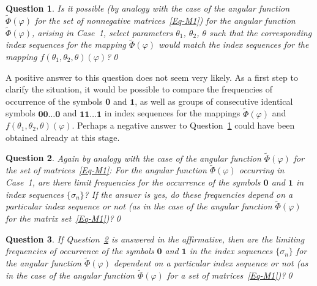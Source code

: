 \documentclass[a4paper,10pt,reqno]{amsart}
\newtheorem{question}{Question}
\begin{document}
\begin{question}\label{Q:2}\rm
Is it possible (by analogy with the case of the angular function
$\tilde{\varPhi}(\varphi)$ for the set of nonnegative matrices~\eqref{Eq-M1})
for the angular function $\tilde{\varPhi}(\varphi)$, arising in Case~1,
select parameters $\theta_{1}$, $\theta_{2}$, $\theta$ such that the
corresponding index sequences for the mapping $\tilde{\varPhi}(\varphi)$
would match the index sequences for the mapping
$f(\theta_{1},\theta_{2},\theta)(\varphi)$?\qed
\end{question}

A positive answer to this question does not seem very likely. As a first step
to clarify the situation, it would be possible to compare the frequencies of
occurrence of the symbols $\boldsymbol{0}$ and $\boldsymbol{1}$, as well as
groups of consecutive identical symbols $\boldsymbol{00\ldots0}$ and
$\boldsymbol{11\ldots1}$ in index sequences for the mappings
$\tilde{\varPhi}(\varphi)$ and $f(\theta_{1},\theta_{2},\theta)(\varphi)$.
Perhaps a negative answer to Question~\ref{Q:2} could have been obtained
already at this stage.

\begin{question}\label{Q:3}\rm
Again by analogy with the case of the angular function
$\tilde{\varPhi}(\varphi)$ for the set of matrices~\eqref{Eq-M1}: For the
angular function $\tilde{\varPhi}(\varphi)$ occurring in Case~1, are there
limit frequencies for the occurrence of the symbols $\boldsymbol{0}$ and
$\boldsymbol{1}$ in index sequences $\{\sigma_{n}\}$? If the answer is yes,
do these frequencies depend on a particular index sequence or not (as in the
case of the angular function $\tilde{\varPhi}(\varphi)$ for the matrix
set~\eqref{Eq-M1})?\qed
\end{question}

\begin{question}\label{Q:4}\rm
If Question~\ref{Q:3} is answered in the affirmative, then are the limiting
frequencies of occurrence of the symbols $\boldsymbol{0}$ and
$\boldsymbol{1}$ in the index sequences $\{\sigma_{n}\}$ for the angular
function $\tilde{\varPhi}(\varphi)$ dependent on a particular index sequence
or not (as in the case of the angular function $\tilde{\varPhi}(\varphi)$ for
a set of matrices~\eqref{Eq-M1})?\qed
\end{question}
\end{document}
